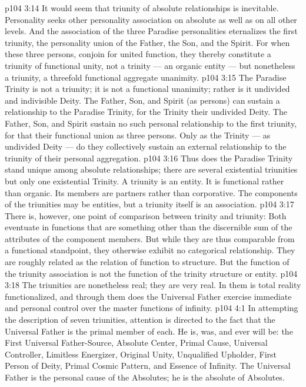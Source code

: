 \vs p104 3:14 \pc It would seem that triunity of absolute relationships is inevitable. Personality seeks other personality association on absolute as well as on all other levels. And the association of the three Paradise personalities eternalizes the first triunity, the personality union of the Father, the Son, and the Spirit. For when these three persons,  conjoin for united function, they thereby constitute a triunity of functional unity, not a trinity --- an organic entity --- but nonetheless a triunity, a threefold functional aggregate unanimity.
\vs p104 3:15 The Paradise Trinity is not a triunity; it is not a functional unanimity; rather is it undivided and indivisible Deity. The Father, Son, and Spirit (as persons) can sustain a relationship to the Paradise Trinity, for the Trinity  their undivided Deity. The Father, Son, and Spirit sustain no such personal relationship to the first triunity, for that  their functional union as three persons. Only as the Trinity --- as undivided Deity --- do they collectively sustain an external relationship to the triunity of their personal aggregation.
\vs p104 3:16 Thus does the Paradise Trinity stand unique among absolute relationships; there are several existential triunities but only one existential Trinity. A triunity is  an entity. It is functional rather than organic. Its members are partners rather than corporative. The components of the triunities may be entities, but a triunity itself is an association.
\vs p104 3:17 There is, however, one point of comparison between trinity and triunity: Both eventuate in functions that are something other than the discernible sum of the attributes of the component members. But while they are thus comparable from a functional standpoint, they otherwise exhibit no categorical relationship. They are roughly related as the relation of function to structure. But the function of the triunity association is not the function of the trinity structure or entity.
\vs p104 3:18 The triunities are nonetheless real; they are very real. In them is total reality functionalized, and through them does the Universal Father exercise immediate and personal control over the master functions of infinity.
\vs p104 4:1 In attempting the description of seven triunities, attention is directed to the fact that the Universal Father is the primal member of each. He is, was, and ever will be: the First Universal Father\hyp{}Source, Absolute Center, Primal Cause, Universal Controller, Limitless Energizer, Original Unity, Unqualified Upholder, First Person of Deity, Primal Cosmic Pattern, and Essence of Infinity. The Universal Father is the personal cause of the Absolutes; he is the absolute of Absolutes.
